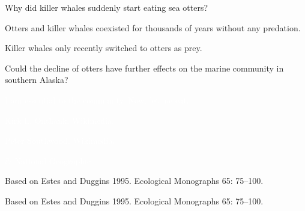 \documentclass[t,handout]{beamer}  %
\begin{document}
\begin{frame}[t]{Why did killer whales suddenly start eating sea otters?}

	\hangpara Otters and killer whales coexisted for thousands of years without any predation.

	\hangpara Killer whales only recently switched to otters as prey.

	\hangpara Could the decline of otters have further effects on the marine community in southern Alaska?

\end{frame}
%
{
\begin{frame}[b]{\textcolor{white}{I am essential to the community. Now, let me eat.}}
\end{frame}
}
%
{
\begin{frame}[b]
	\hfill \tiny \textcolor{white}{Kirk L. Onthank, Wikimedia, }
\end{frame}
}
%
{
\begin{frame}[b]
	\hfill \tiny \textcolor{white}{Peter Southwood, Wikimedia, }
\end{frame}
}
%
{
\begin{frame}[b]
	 \tiny \textcolor{white}{\copyright\ National Geographic}
\end{frame}
}
%
{
\begin{frame}[b]
	\tiny Based on Estes and Duggins 1995. Ecological Monographs 65: 75--100.
\end{frame}
}
%
{
\begin{frame}[b]
	\tiny Based on Estes and Duggins 1995. Ecological Monographs 65: 75--100.
\end{frame}
}
%
\end{document}
